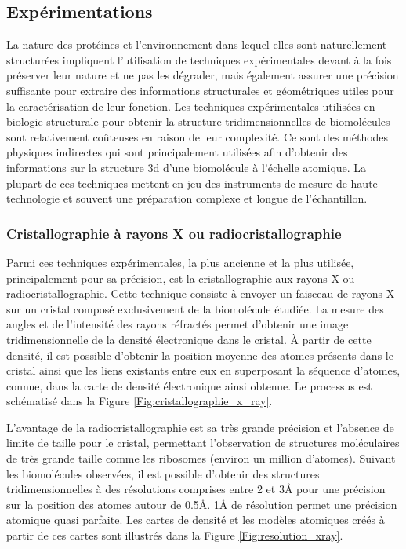 \subsection{Expérimentations}

La nature des protéines et l'environnement dans lequel elles sont naturellement structurées impliquent l'utilisation de techniques expérimentales devant à la fois préserver leur nature et ne pas les dégrader, mais également assurer une précision suffisante pour extraire des informations structurales et géométriques utiles pour la caractérisation de leur fonction.
Les techniques expérimentales utilisées en biologie structurale pour obtenir la structure tridimensionnelles de biomolécules sont relativement coûteuses en raison de leur complexité. Ce sont des méthodes physiques indirectes qui sont principalement utilisées afin d'obtenir des informations sur la structure 3d d'une biomolécule à l'échelle atomique. La plupart de ces techniques mettent en jeu des instruments de mesure de haute technologie et souvent une préparation complexe et longue de l'échantillon.

\subsubsection{Cristallographie à rayons X ou radiocristallographie}

Parmi ces techniques expérimentales, la plus ancienne et la plus utilisée, principalement pour sa précision, est la cristallographie aux rayons X ou radiocristallographie. Cette technique consiste à envoyer un faisceau de rayons X sur un cristal composé exclusivement de la biomolécule étudiée. La mesure des angles et de l'intensité des rayons réfractés permet d'obtenir une image tridimensionnelle de la densité électronique dans le cristal. À partir de cette densité, il est possible d'obtenir la position moyenne des atomes présents dans le cristal ainsi que les liens existants entre eux en superposant la séquence d'atomes, connue, dans la carte de densité électronique ainsi obtenue. Le processus est schématisé dans la Figure \ref{Fig:cristallographie_x_ray}.

L'avantage de la radiocristallographie est sa très grande précision et l'absence de limite de taille pour le cristal, permettant l'observation de structures moléculaires de très grande taille comme les ribosomes (environ un million d'atomes). Suivant les biomolécules observées, il est possible d'obtenir des structures tridimensionnelles à des résolutions comprises entre 2 et 3\r{A} pour une précision sur la position des atomes autour de 0.5\r{A}. 1\r{A} de résolution permet une précision atomique quasi parfaite. Les cartes de densité et les modèles atomiques créés à partir de ces cartes sont illustrés dans la Figure \ref{Fig:resolution_xray}.

